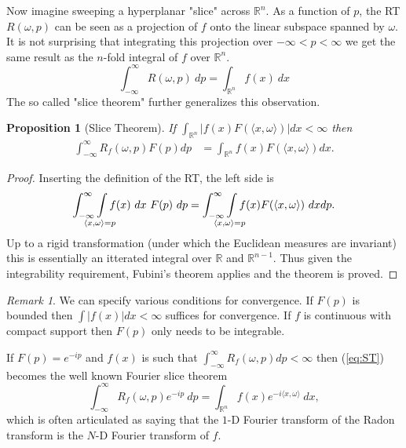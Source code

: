 \documentclass{amsart}
\newtheorem{proposition}[theorem]{Proposition}
\theoremstyle{remark}
\newtheorem{remark}[theorem]{Remark}
\numberwithin{equation}{section}
\newcommand{\RR}{\mathbb{R}}
\def\mclimits_#1{\limits_{\mathclap{#1}}}
\begin{document}
Now imagine sweeping a hyperplanar "slice" across $\RR^n$. As a function of $p$, the RT $R(\omega, p)$ can be seen as a projection of $f$ onto the linear subspace spanned by $\omega$. It is not surprising that integrating this projection over $-\infty < p < \infty$ we get the same result as the $n$-fold integral of $f$ over $\RR^n$.
\[
    \int_{-\infty}^\infty R(\omega, p) ~dp = \int_{\RR^n} f(x) ~dx
\]
The so called "slice theorem" further generalizes this observation.
\begin{proposition}[Slice Theorem]
    If $\int_{\mathbb{R}^n} |f(x) F(\langle x, \omega \rangle)| dx < \infty$ then
    \begin{align}
        \label{eq:ST}
        \int_{-\infty}^\infty R_f(\omega, p) F(p) dp 
        &= \int_{\mathbb{R}^n} f(x) F(\langle x, \omega \rangle) dx.
    \end{align}
\end{proposition}

\begin{proof}
Inserting the definition of the RT, the left side is
\[
    \int_{-\infty}^\infty \int\mclimits_{\langle x, \omega \rangle = p} f(x) ~dx~ F(p) ~dp 
    = \int_{-\infty}^\infty \int\mclimits_{\langle x, \omega \rangle = p} f(x) F(\langle x, \omega \rangle) ~dx dp.
\]
Up to a rigid transformation (under which the Euclidean measures are invariant) this is essentially an itterated integral over $\RR$ and $\RR^{n-1}$. Thus given the integrability requirement, Fubini's theorem applies and the theorem is proved.
\end{proof}

\begin{remark}
We can specify various conditions for convergence. If $F(p)$ is bounded then $\int |f(x)| dx < \infty$ suffices for convergence. If $f$ is continuous with compact support then $F(p)$ only needs to be integrable.  
\end{remark}

If $F(p) = e^{-ip}$ and $f(x)$ is such that $\int_{-\infty}^\infty R_f(\omega, p) dp < \infty$ then (\ref{eq:ST}) becomes the well known Fourier slice theorem
\[
    \int_{-\infty}^\infty R_f(\omega, p) e^{-ip} ~dp
    = \int_{\mathbb{R}^n} f(x) e^{-i\langle x, \omega\rangle} ~dx,
\]
which is often articulated as saying that the $1$-D Fourier transform of the Radon transform is the $N$-D Fourier transform of $f$.
\end{document}
